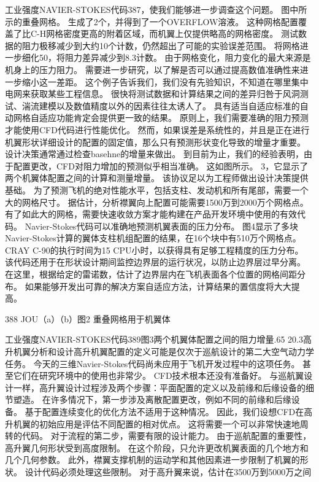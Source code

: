 \documentclass[UTF8,11pt,a4paper,openany,fontset=fandol]{ctexbook}
\begin{document}
工业强度NAVIER-STOKES代码387，使我们能够进一步调查这个问题。 图中所示的重叠网格。 生成了2个，并得到了一个OVERFLOW溶液。 这种网格配置覆盖了比C-H网格密度更高的附着区域，而机翼上仅提供略高的网格密度。 测试数据的阻力极移减少到大约10个计数，仍然超出了可能的实验误差范围。 将网格进一步细化50，将阻力差异减少到8.3计数。 由于网格变化，阻力变化的最大来源是机身上的压力阻力。 需要进一步研究，以了解是否可以通过提高数值准确性来进一步缩小这一差距。 这个例子告诉我们，我们没有先验知识，不知道在哪里集中电网来获取某些工程信息。 很快将测试数据和计算结果之间的差异归咎于风洞测试、湍流建模以及数值精度以外的因素往往太诱人了。 具有适当自适应标准的自动网格自适应功能肯定会提供更一致的结果。 原则上，我们需要准确的阻力预测才能使用CFD代码进行性能优化。 然而，如果误差是系统性的，并且是正在进行机翼形状详细设计的配置的固定值，那么只有预测形状变化导致的增量才重要。 设计决策通常通过检查basehne的增量来做出。 到目前为止，我们的经验表明，由于配置更改，CFD对阻力增加的预测似乎相当准确。 这如图所示。 3，它显示了两个机翼体配置之间的计算和测量增量。 该协议足以为工程师做出设计决策提供基础。 为了预测飞机的绝对性能水平，包括支柱、发动机和所有尾部，需要一个大的网格尺寸。 据估计，分析襟翼向上配置可能需要1500万到2000万个网格点。 有了如此大的网格，需要快速收敛方案才能构建在产品开发环境中使用的有效代码。 Navier-Stokes代码可以准确地预测机翼表面的压力分布。 图4显示了多块Navier-Stokes计算的翼体支柱机组配置的结果，在16个块中有510万个网格点。 CRAY C-90的执行时间为15 CPU小时，以获得具有足够工程精度的压力分布。 该代码还用于在形状设计期间监控边界层的运行状况，以防止边界层过早分离。 在这里，根据给定的雷诺数，估计了边界层内在飞机表面各个位置的网格间距分布。 如果能够开发出可靠的解决方案自适应方法，计算结果的置信度将大大提高。

388 JOU（a）（b）图2 重叠网格用于机翼体

工业强度NAVIER-STOKES代码389图3两个机翼体配置之间的阻力增量.65 20.3高升机翼分析和设计高升机翼配置的定义可能是仅次于巡航设计的第二大空气动力学任务。 今天的三维Navier-Stokes代码尚未应用于飞机开发过程中的这项任务。 甚至它们在研究环境中的使用也非常少。 CFD技术根本还没有准备好。 与巡航翼设计一样，高升翼设计过程涉及两个步骤：平面配置的定义以及前缘和后缘设备的细节塑造。 在许多情况下，第一步涉及离散配置更改，例如不同的前缘和后缘设备。 基于配置连续变化的优化方法不适用于这种情况。 因此，我们设想CFD在高升机翼的初始应用是评估不同配置的相对优点。 这将需要一个可以非常快速地周转的代码。 对于流程的第二步，需要有限的设计能力。 由于巡航配置的重要性，高升翼几何形状受到高度限制。 在这个阶段，只允许更改机翼表面的几个地方和几个几何参数。 此外，襟翼支撑机制的运动学和其他因素进一步限制了机翼的形状。 设计代码必须处理这些限制。 对于高升翼来说，估计在3500万到5000万之间
\end{document}
